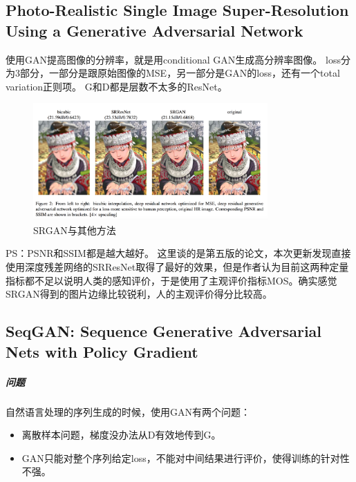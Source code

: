 \documentclass[a4paper]{article}
\begin{document}
\subsection{Photo-Realistic Single Image Super-Resolution Using a Generative Adversarial Network\cite{DBLP:journals/corr/LedigTHCATTWS16}}
使用GAN提高图像的分辨率，就是用conditional GAN生成高分辨率图像。
loss分为3部分，一部分是跟原始图像的MSE，另一部分是GAN的loss，还有一个total variation正则项。
G和D都是层数不太多的ResNet。
\begin{figure}
\centering
\includegraphics[width=0.8\textwidth]{./img/23.png}
\caption{SRGAN与其他方法}
\label{fig:23}
\end{figure}
PS：PSNR和SSIM都是越大越好。
这里谈的是第五版的论文，本次更新发现直接使用深度残差网络的SRResNet取得了最好的效果，但是作者认为目前这两种定量指标都不足以说明人类的感知评价，于是使用了主观评价指标MOS。确实感觉SRGAN得到的图片边缘比较锐利，人的主观评价得分比较高。
\subsection{SeqGAN: Sequence Generative Adversarial Nets with Policy Gradient\cite{DBLP:journals/corr/YuZWY16}}
\subparagraph{问题}
自然语言处理的序列生成的时候，使用GAN有两个问题：
\begin{itemize}
\item 离散样本问题，梯度没办法从D有效地传到G。
\item GAN只能对整个序列给定loss，不能对中间结果进行评价，使得训练的针对性不强。
\end{itemize}
\end{document}
